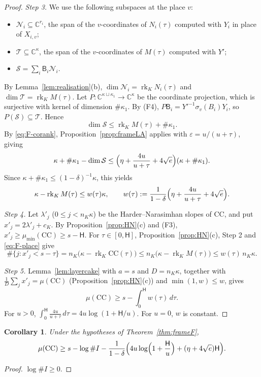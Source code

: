 \documentclass[10pt]{amsart}
\newtheorem{corollary}[theorem]{Corollary}
\theoremstyle{definition}
\theoremstyle{remark}
\newcommand{\C}{\mathbb C}
\begin{document}
\begin{proof}
\emph{Step 3.} We use the following subspaces at the place $v$:
\begin{itemize}
\item $\mathcal N_i\subseteq\C^{r_i}$, the span of the $v$-coordinates of $N_i(\tau)$ computed with $Y_i$ in place of $X_{i,v}$;
\item $\mathcal T\subseteq\C^\kappa$, the span of the $v$-coordinates of $M(\tau)$ computed with $Y'$;
\item $\mathcal S=\sum_i\mathsf B_i\mathcal N_i$.
\end{itemize}
By Lemma~\ref{lem:realisation}(b), $\dim\mathcal N_i=\operatorname{rk}_KN_i(\tau)$ and $\dim\mathcal T=\operatorname{rk}_KM(\tau)$. Let $P\colon\C^{\kappa\sqcup\kappa_1}\to\C^\kappa$ be the coordinate projection, which is surjective with kernel of dimension $\#\kappa_1$. By (F4), $P\mathsf B_i=Y'^{-1}\sigma_v(B_i)Y_i$, so $P(\mathcal S)\subseteq\mathcal T$. Hence
\[
\dim\mathcal S\le\operatorname{rk}_KM(\tau)+\#\kappa_1 .
\]
By \eqref{eq:F-corank}, Proposition~\ref{prop:frameLA} applies with $\varepsilon=u/(u+\tau)$, giving
\[
\kappa+\#\kappa_1-\dim\mathcal S\le\Bigl(\eta+\frac{4u}{u+\tau}+4\sqrt e\Bigr)(\kappa+\#\kappa_1).
\]
Since $\kappa+\#\kappa_1\le(1-\delta)^{-1}\kappa$, this yields
\begin{equation}\label{eq:F-place}
\kappa-\operatorname{rk}_KM(\tau)\le w(\tau)\kappa,\qquad w(\tau):=\frac1{1-\delta}\Bigl(\eta+\frac{4u}{u+\tau}+4\sqrt e\Bigr).
\end{equation}

\emph{Step 4.} Let $\lambda'_j$ ($0\le j<n_K\kappa$) be the Harder--Narasimhan slopes of $\mathrm{CC}$, and put $x'_j=2\lambda'_j+c_K$. By Proposition~\ref{prop:HN}(c) and (F3), $x'_j\ge\mu_{\min}(\mathrm{CC})\ge s-\mathsf H$. For $\tau\in[0,\mathsf H]$, Proposition~\ref{prop:HN}(c), Step 2 and \eqref{eq:F-place} give
\[
\#\{j:x'_j<s-\tau\}=n_K\bigl(\kappa-\operatorname{rk}_K\mathrm{CC}(\tau)\bigr)\le n_K\bigl(\kappa-\operatorname{rk}_KM(\tau)\bigr)\le w(\tau)\,n_K\kappa .
\]

\emph{Step 5.} Lemma~\ref{lem:layercake} with $a=s$ and $D=n_K\kappa$, together with $\frac1D\sum_jx'_j=\mu(\mathrm{CC})$ (Proposition~\ref{prop:HN}(c)) and $\min(1,w)\le w$, gives
\[
\mu(\mathrm{CC})\ge s-\int_0^{\mathsf H}w(\tau)\,d\tau .
\]
For $u>0$, $\int_0^{\mathsf H}\frac{4u}{u+\tau}\,d\tau=4u\log(1+\mathsf H/u)$. For $u=0$, $w$ is constant.
\end{proof}

\begin{corollary}\label{cor:frameF-log}
Under the hypotheses of Theorem~\ref{thm:frameF},
\[
\mu(\mathrm{CC})\ge s-\log\#I-\frac{1}{1-\delta}\Bigl(4u\log\Bigl(1+\frac{\mathsf H}{u}\Bigr)+(\eta+4\sqrt e)\mathsf H\Bigr).
\]
\end{corollary}
\begin{proof}
$\log\#I\ge0$.
\end{proof}
\end{document}
